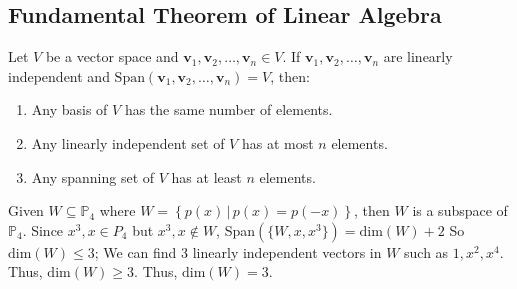 \documentclass[11pt]{article}
\begin{document}
\subsection{Fundamental Theorem of Linear Algebra}
\begin{theorem}
    Let $V$ be a vector space and $\textbf{v}_1, \textbf{v}_2, \ldots, \textbf{v}_n \in V$. If $\textbf{v}_1, \textbf{v}_2, \ldots, \textbf{v}_n$ are linearly independent and $\text{Span}(\textbf{v}_1, \textbf{v}_2, \ldots, \textbf{v}_n) = V$, then:
    \begin{enumerate}
        \item Any basis of $V$ has the same number of elements.
        \item Any linearly independent set of $V$ has at most $n$ elements.
        \item Any spanning set of $V$ has at least $n$ elements.
    \end{enumerate}
\end{theorem}
\begin{example}
    Given $W \subseteq \mathbb{P}_4$ where $W = \left\{ p(x) \, | \, p(x) = p(-x) \right\}$, then $W$ is a subspace of $\mathbb{P}_4$. Since $x^3, x \in P_4$ but $x^3, x \notin W$,  Span$(\{W, x, x^3\}) = \mathrm{dim}(W) + 2$ So $\mathrm{dim}(W) \le 3$; We can find 3 linearly independent vectors in $W$ such as $1, x^2, x^4$. Thus, $\mathrm{dim}(W) \ge 3$. Thus, $\mathrm{dim}(W) = 3$.
\end{example}
\end{document}
